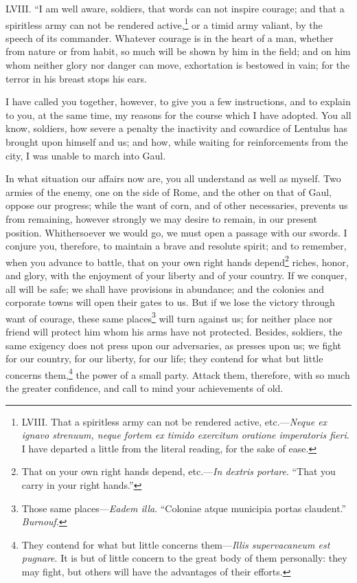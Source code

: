 LVIII. ``I am well aware, soldiers, that words can not inspire courage;
and that a spiritless army can not be rendered active,\footnote{LVIII. That a spiritless army can not be rendered active,
etc.—\emph{Neque ex ignavo strenuum, neque fortem ex timido exercitum
oratione imperatoris fieri}. I have departed a little from the literal
reading, for the sake of ease.} or a timid
army valiant, by the speech of its commander. Whatever courage is in
the heart of a man, whether from nature or from habit, so much will be
shown by him in the field; and on him whom neither glory nor danger
can move, exhortation is bestowed in vain; for the terror in his
breast stops his ears.

I have called you together, however, to give you a few instructions,
and to explain to you, at the same time, my reasons for the course
which I have adopted. You all know, soldiers, how severe a penalty the
inactivity and cowardice of Lentulus has brought upon himself and us;
and how, while waiting for reinforcements from the city, I was unable
to march into Gaul.

In what situation our affairs now are, you all understand as well as
myself. Two armies of the enemy, one on the side of Rome, and the
other on that of Gaul, oppose our progress; while the want of corn,
and of other necessaries, prevents us from remaining, however strongly
we may desire to remain, in our present position. Whithersoever we
would go, we must open a passage with our swords. I conjure you,
therefore, to maintain a brave and resolute spirit; and to remember,
when you advance to battle, that on your own right hands depend\footnote{That on your own right hands depend, etc.—\emph{In dextris
portare}. ``That you carry in your right hands.''}
riches, honor, and glory, with the enjoyment of your liberty and of
your country. If we conquer, all will be safe; we shall have
provisions in abundance; and the colonies and corporate towns will
open their gates to us. But if we lose the victory through want of
courage, these same places\footnote{Those same places—\emph{Eadem illa}. ``Coloniae atque municipia
portas claudent.'' \emph{Burnouf}.} will turn against us; for neither
place nor friend will protect him whom his arms have not protected.
Besides, soldiers, the same exigency does not press upon our
adversaries, as presses upon us; we fight for our country, for our
liberty, for our life; they contend for what but little concerns
them,\footnote{They contend for what but little concerns them—\emph{Illis
supervacaneum est pugnare}. It is but of little concern to the great
body of them personally: they may fight, but others will have the
advantages of their efforts.} the power of a small party. Attack them, therefore, with so
much the greater confidence, and call to mind your achievements of
old.

